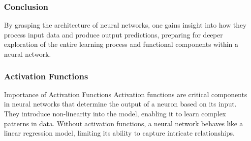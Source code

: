 \documentclass{beamer}
\begin{document}
\begin{frame}[fragile]
    \frametitle{Conclusion}
    By grasping the architecture of neural networks, one gains insight into how they process input data and produce output predictions, preparing for deeper exploration of the entire learning process and functional components within a neural network.
\end{frame}

\begin{frame}[fragile]
    \frametitle{Activation Functions}
    \begin{block}{Importance of Activation Functions}
        Activation functions are critical components in neural networks that determine the output of a neuron based on its input. 
        They introduce non-linearity into the model, enabling it to learn complex patterns in data. 
        Without activation functions, a neural network behaves like a linear regression model, limiting its ability to capture intricate relationships.
    \end{block}
\end{frame}
\end{document}
